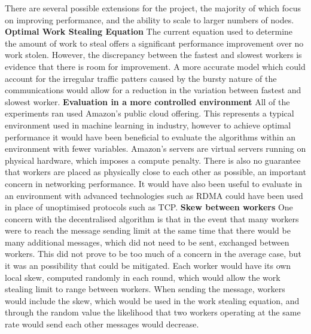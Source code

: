 \documentclass[12pt]{article}
\begin{document}
There are several possible extensions for the project, the majority of which focus on improving performance, and the ability to scale to larger numbers of nodes.
\newline
\newline
\textbf{Optimal Work Stealing Equation}		The current equation used to determine the amount of work to steal offers a significant performance improvement over no work stolen. However, the discrepancy between the fastest and slowest workers is evidence that there is room for improvement. A more accurate model which could account for the irregular traffic patters caused by the bursty nature of the communications would allow for a reduction in the variation between fastest and slowest worker.
\newline
\newline
\textbf{Evaluation in a more controlled environment}		All of the experiments ran used Amazon's public cloud offering. This represents a typical environment used in machine learning in industry, however to achieve optimal performance it would have been beneficial to evaluate the algorithms within an environment with fewer variables. Amazon's servers are virtual servers running on physical hardware, which imposes a compute penalty. There is also no guarantee that workers are placed as physically close to each other as possible, an important concern in networking performance. It would have also been useful to evaluate in an environment with advanced technologies such as RDMA could have been used in place of unoptimised protocols such as TCP.
\newline
\newline
\textbf{Skew between workers}	One concern with the decentralised algorithm is that in the event that many workers were to reach the message sending limit at the same time that there would be many additional messages, which did not need to be sent, exchanged between workers. This did not prove to be too much of a concern in the average case, but it was an possibility that could be mitigated. Each worker would have its own local skew, computed randomly in each round, which would allow the work stealing limit to range between workers. When sending the  message, workers would include the skew, which would be used in the work stealing equation, and through the random value the likelihood that two workers operating at the same rate would send each other  messages would decrease.
\newline
\newline
\end{document}
